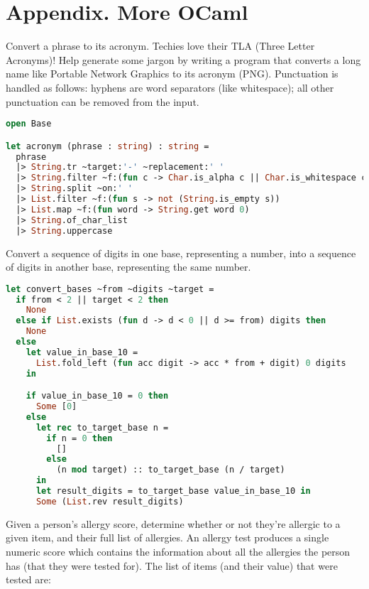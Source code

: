 \clearpage
{}
\section*{Appendix. More OCaml}

Convert a phrase to its acronym.
Techies love their TLA (Three Letter Acronyms)!
Help generate some jargon by writing a program that converts a long name like Portable Network Graphics to its acronym (PNG).
Punctuation is handled as follows: hyphens are word separators (like whitespace); all other punctuation can be removed from the input.

\begin{lstlisting}[language=OCaml]
open Base

let acronym (phrase : string) : string =
  phrase
  |> String.tr ~target:'-' ~replacement:' '
  |> String.filter ~f:(fun c -> Char.is_alpha c || Char.is_whitespace c)
  |> String.split ~on:' '
  |> List.filter ~f:(fun s -> not (String.is_empty s))
  |> List.map ~f:(fun word -> String.get word 0)
  |> String.of_char_list
  |> String.uppercase
\end{lstlisting}

Convert a sequence of digits in one base, representing a number, into a sequence of digits in another base, representing the same number.

\begin{lstlisting}[language=OCaml]
let convert_bases ~from ~digits ~target =
  if from < 2 || target < 2 then
    None
  else if List.exists (fun d -> d < 0 || d >= from) digits then
    None
  else
    let value_in_base_10 =
      List.fold_left (fun acc digit -> acc * from + digit) 0 digits
    in

    if value_in_base_10 = 0 then
      Some [0]
    else
      let rec to_target_base n =
        if n = 0 then
          []
        else
          (n mod target) :: to_target_base (n / target)
      in
      let result_digits = to_target_base value_in_base_10 in
      Some (List.rev result_digits)
\end{lstlisting}

Given a person's allergy score, determine whether or not they're allergic to a given item, and their full list of allergies.
An allergy test produces a single numeric score which contains the information about all the allergies the person has (that they were tested for).
The list of items (and their value) that were tested are:

